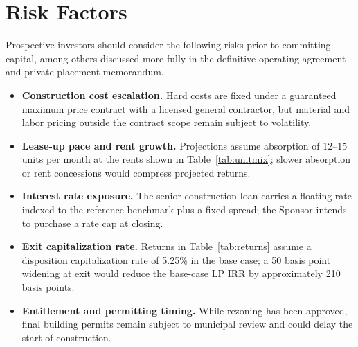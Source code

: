\section{Risk Factors}
Prospective investors should consider the following risks prior to committing capital, among
others discussed more fully in the definitive operating agreement and private placement
memorandum.

\begin{itemize}
  \item \textbf{Construction cost escalation.} Hard costs are fixed under a guaranteed maximum
    price contract with a licensed general contractor, but material and labor pricing outside
    the contract scope remain subject to volatility.
  \item \textbf{Lease-up pace and rent growth.} Projections assume absorption of 12--15 units
    per month at the rents shown in Table~\ref{tab:unitmix}; slower absorption or rent
    concessions would compress projected returns.
  \item \textbf{Interest rate exposure.} The senior construction loan carries a floating rate
    indexed to the reference benchmark plus a fixed spread; the Sponsor intends to purchase a
    rate cap at closing.
  \item \textbf{Exit capitalization rate.} Returns in Table~\ref{tab:returns} assume a
    disposition capitalization rate of 5.25\% in the base case; a 50 basis point widening at
    exit would reduce the base-case LP IRR by approximately 210 basis points.
  \item \textbf{Entitlement and permitting timing.} While rezoning has been approved, final
    building permits remain subject to municipal review and could delay the start of
    construction.
\end{itemize}

